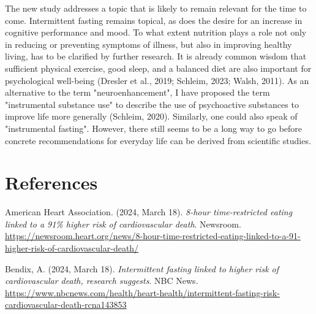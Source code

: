 \documentclass[authordate, empirical]{jote-new-article}
\begin{document}
The new study addresses a topic that is likely to remain relevant for the time to come. Intermittent fasting remains topical, as does the desire for an increase in cognitive performance and mood. To what extent nutrition plays a role not only in reducing or preventing symptoms of illness, but also in improving healthy living, has to be clarified by further research. It is already common wisdom that sufficient physical exercise, good sleep, and a balanced diet are also important for psychological well-being (Dresler et al., 2019; Schleim, 2023; Walsh, 2011). As an alternative to the term "neuroenhancement", I have proposed the term "instrumental substance use" to describe the use of psychoactive substances to improve life more generally (Schleim, 2020). Similarly, one could also speak of "instrumental fasting". However, there still seems to be a long way to go before concrete recommendations for everyday life can be derived from scientific studies.



















\section{References}



\hspace*{\parindent}American Heart Association. (2024, March 18). \emph{8-hour time-restricted eating linked to a 91\% higher risk of cardiovascular death}. Newsroom. \href{https://newsroom.heart.org/news/8-hour-time-restricted-eating-linked-to-a-91-higher-risk-of-cardiovascular-death/}{https://newsroom.heart.org/news/8-hour-time-restricted-eating-linked-to-a-91-higher-risk-of-cardiovascular-death/}







Bendix, A. (2024, March 18). \emph{Intermittent fasting linked to higher risk of cardiovascular death, research suggests}. NBC News\emph{.} \url{https://www.nbcnews.com/health/heart-health/intermittent-fasting-risk-cardiovascular-death-rcna143853}
\end{document}
